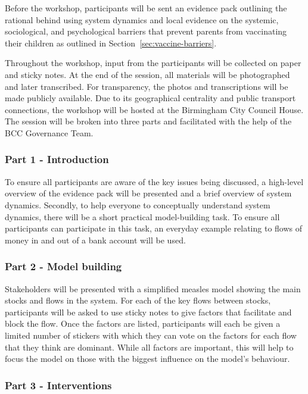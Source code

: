 \documentclass{article}
\begin{document}
Before the workshop, participants will be sent an evidence pack outlining the rational behind using system dynamics and local evidence on the systemic, sociological, and psychological barriers that prevent parents from vaccinating their children as outlined in Section~\ref{sec:vaccine-barriers}.

Throughout the workshop, input from the participants will be collected on paper and sticky notes. At the end of the session, all materials will be photographed and later transcribed. For transparency, the photos and transcriptions will be made publicly available. Due to its geographical centrality and public transport connections, the workshop will be hosted at the Birmingham City Council House. The session will be broken into three parts and facilitated with the help of the BCC Governance Team.

\subsubsection{Part 1 - Introduction}

To ensure all participants are aware of the key issues being discussed, a high-level overview of the evidence pack will be presented and a brief overview of system dynamics. Secondly, to help everyone to conceptually understand system dynamics, there will be a short practical model-building task. To ensure all participants can participate in this task, an everyday example relating to flows of money in and out of a bank account will be used.

\subsubsection{Part 2 - Model building}

Stakeholders will be presented with a simplified measles model showing the main stocks and flows in the system. For each of the key flows between stocks, participants will be asked to use sticky notes to give factors that facilitate and block the flow. Once the factors are listed, participants will each be given a limited number of stickers with which they can vote on the factors for each flow that they think are dominant. While all factors are important, this will help to focus the model on those with the biggest influence on the model’s behaviour.

\subsubsection{Part 3 - Interventions}
\end{document}
